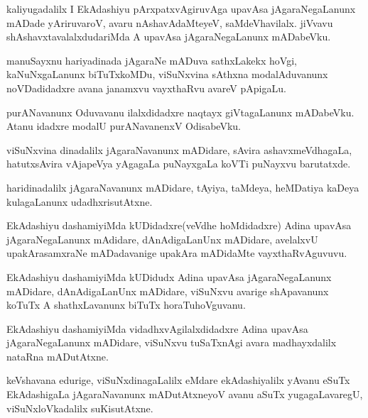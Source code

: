 \documentclass{article}
\begin{document}
\begin{mn}%
kaliyugadalilx I EkAdashiyu pArxpatxvAgiruvAga upavAsa jAgaraNegaLanunx mADade yAriruvaroV, avaru 
nAshavAdaMteyeV, saMdeVhavilalx. jiVvavu shAshavxtavalalxdudariMda A upavAsa jAgaraNegaLanunx 
mADabeVku.
\end{mn}

\begin{mn}%
manuSayxnu hariyadinada jAgaraNe mADuva sathxLakekx hoVgi, kaNuNxgaLanunx biTuTxkoMDu, viSuNxvina 
sAthxna modalAduvanunx noVDadidadxre avana janamxvu vayxthaRvu avareV pApigaLu.
\end{mn}

\begin{mn}%
purANavanunx Oduvavanu ilalxdidadxre naqtayx giVtagaLanunx mADabeVku. Atanu idadxre modalU 
purANavanenxV OdisabeVku.
\end{mn}

\begin{mn}%
viSuNxvina dinadalilx jAgaraNavanunx mADidare, sAvira ashavxmeVdhagaLa, hatutxsAvira vAjapeVya 
yAgagaLa puNayxgaLa koVTi puNayxvu barutatxde.
\end{mn}

\begin{mn}%
haridinadalilx jAgaraNavanunx mADidare, tAyiya, taMdeya, heMDatiya kaDeya kulagaLanunx 
udadhxrisutAtxne.
\end{mn}

\begin{mn}%
EkAdashiyu dashamiyiMda kUDidadxre(veVdhe hoMdidadxre) Adina upavAsa jAgaraNegaLanunx mAdidare, 
dAnAdigaLanUnx mADidare, avelalxvU upakArasamxraNe mADadavanige upakAra mADidaMte vayxthaRvAguvuvu.
\end{mn}

\begin{mn}%
EkAdashiyu dashamiyiMda kUDidudx Adina upavAsa jAgaraNegaLanunx mADidare, dAnAdigaLanUnx mADidare, 
viSuNxvu avarige shApavanunx koTuTx A shathxLavanunx biTuTx horaTuhoVguvanu.
\end{mn}

\begin{mn}%
EkAdashiyu dashamiyiMda vidadhxvAgilalxdidadxre Adina upavAsa jAgaraNegaLanunx mADidare, viSuNxvu 
tuSaTxnAgi avara madhayxdalilx nataRna mADutAtxne.
\end{mn}

\begin{mn}%
keVshavana edurige, viSuNxdinagaLalilx eMdare ekAdashiyalilx yAvanu eSuTx EkAdashigaLa 
jAgaraNavanunx mADutAtxneyoV avanu aSuTx yugagaLavaregU, viSuNxloVkadalilx suKisutAtxne.
\end{mn}
\end{document}
